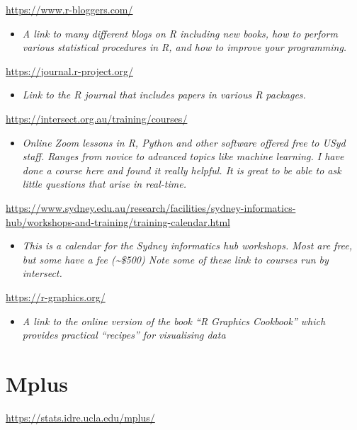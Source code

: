 \documentclass[
]{book}
\providecommand{\tightlist}{%
  \setlength{\itemsep}{0pt}\setlength{\parskip}{0pt}}
\begin{document}
\url{https://www.r-bloggers.com/}

\begin{itemize}
\tightlist
\item
  \emph{A link to many different blogs on R including new books, how to perform various statistical procedures in R, and how to improve your programming.}
\end{itemize}

\url{https://journal.r-project.org/}

\begin{itemize}
\tightlist
\item
  \emph{Link to the R journal that includes papers in various R packages.}
\end{itemize}

\url{https://intersect.org.au/training/courses/}

\begin{itemize}
\tightlist
\item
  \emph{Online Zoom lessons in R, Python and other software offered free to USyd staff. Ranges from novice to advanced topics like machine learning. I have done a course here and found it really helpful. It is great to be able to ask little questions that arise in real-time.}
\end{itemize}

\url{https://www.sydney.edu.au/research/facilities/sydney-informatics-hub/workshops-and-training/training-calendar.html}

\begin{itemize}
\tightlist
\item
  \emph{This is a calendar for the Sydney informatics hub workshops. Most are free, but some have a fee (\textasciitilde\$500) Note some of these link to courses run by intersect.}
\end{itemize}

\url{https://r-graphics.org/}

\begin{itemize}
\tightlist
\item
  \emph{A link to the online version of the book ``R Graphics Cookbook'' which provides practical ``recipes'' for visualising data}
\end{itemize}

\section{Mplus}\label{mplus}

\url{https://stats.idre.ucla.edu/mplus/}
\end{document}
